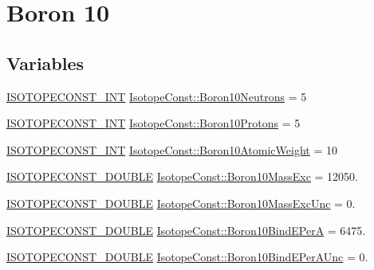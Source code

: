 \hypertarget{group___isotope_const-_boron-_b10}{}\section{Boron 10}
\label{group___isotope_const-_boron-_b10}
\subsection*{Variables}
\begin{DoxyCompactItemize}
\item 
\mbox{\hyperlink{group___isotope_const-_macros_ga5f18360b3e99483a35c32d789e62621c}{I\+S\+O\+T\+O\+P\+E\+C\+O\+N\+S\+T\+\_\+\+I\+NT}} \mbox{\hyperlink{group___isotope_const-_boron-_b10_ga3446d8f22510fdea0d9fad50ace7c3e2}{Isotope\+Const\+::\+Boron10\+Neutrons}} = 5
\item 
\mbox{\hyperlink{group___isotope_const-_macros_ga5f18360b3e99483a35c32d789e62621c}{I\+S\+O\+T\+O\+P\+E\+C\+O\+N\+S\+T\+\_\+\+I\+NT}} \mbox{\hyperlink{group___isotope_const-_boron-_b10_gabef59d78e62ce86a448f449712e0e660}{Isotope\+Const\+::\+Boron10\+Protons}} = 5
\item 
\mbox{\hyperlink{group___isotope_const-_macros_ga5f18360b3e99483a35c32d789e62621c}{I\+S\+O\+T\+O\+P\+E\+C\+O\+N\+S\+T\+\_\+\+I\+NT}} \mbox{\hyperlink{group___isotope_const-_boron-_b10_ga8df4350efa16d2b23bfc8bd357b40a26}{Isotope\+Const\+::\+Boron10\+Atomic\+Weight}} = 10
\item 
\mbox{\hyperlink{group___isotope_const-_macros_ga8f45a7272ce02c0b4c65c44636ed719a}{I\+S\+O\+T\+O\+P\+E\+C\+O\+N\+S\+T\+\_\+\+D\+O\+U\+B\+LE}} \mbox{\hyperlink{group___isotope_const-_boron-_b10_gaf3eaa4df1df3798a8d131f475512b2a9}{Isotope\+Const\+::\+Boron10\+Mass\+Exc}} = 12050.
\item 
\mbox{\hyperlink{group___isotope_const-_macros_ga8f45a7272ce02c0b4c65c44636ed719a}{I\+S\+O\+T\+O\+P\+E\+C\+O\+N\+S\+T\+\_\+\+D\+O\+U\+B\+LE}} \mbox{\hyperlink{group___isotope_const-_boron-_b10_ga58eab26f9c75bc1b1ee5dd1da19ef359}{Isotope\+Const\+::\+Boron10\+Mass\+Exc\+Unc}} = 0.
\item 
\mbox{\hyperlink{group___isotope_const-_macros_ga8f45a7272ce02c0b4c65c44636ed719a}{I\+S\+O\+T\+O\+P\+E\+C\+O\+N\+S\+T\+\_\+\+D\+O\+U\+B\+LE}} \mbox{\hyperlink{group___isotope_const-_boron-_b10_gad83f467d7f2adc946281b553cbed3455}{Isotope\+Const\+::\+Boron10\+Bind\+E\+PerA}} = 6475.
\item 
\mbox{\hyperlink{group___isotope_const-_macros_ga8f45a7272ce02c0b4c65c44636ed719a}{I\+S\+O\+T\+O\+P\+E\+C\+O\+N\+S\+T\+\_\+\+D\+O\+U\+B\+LE}} \mbox{\hyperlink{group___isotope_const-_boron-_b10_ga3077fe91c50fc3282f163d8c4ff9d2ae}{Isotope\+Const\+::\+Boron10\+Bind\+E\+Per\+A\+Unc}} = 0.

\end{DoxyCompactItemize}
